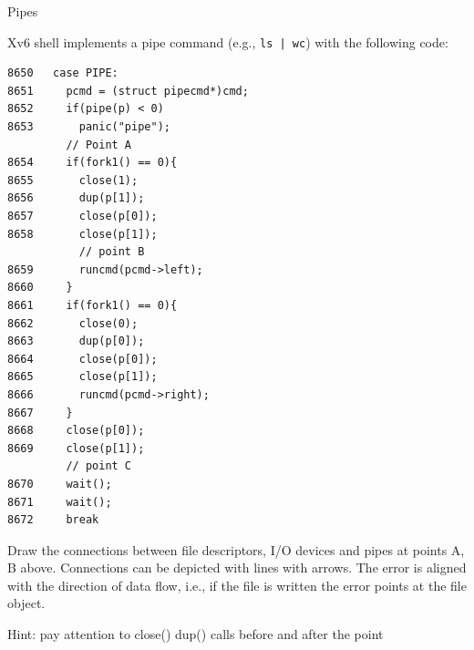 \documentclass[11pt]{exam}
\begin{document}
\begin{questions}

\addpoints 
\question Pipes

Xv6 shell implements a pipe command (e.g., \texttt{ls | wc}) with the following code: 

\begin{verbatim}
8650   case PIPE:
8651     pcmd = (struct pipecmd*)cmd;
8652     if(pipe(p) < 0)
8653       panic("pipe");
         // Point A
8654     if(fork1() == 0){
8655       close(1);
8656       dup(p[1]);
8657       close(p[0]);
8658       close(p[1]);
           // point B
8659       runcmd(pcmd->left);
8660     }
8661     if(fork1() == 0){
8662       close(0);
8663       dup(p[0]);
8664       close(p[0]);
8665       close(p[1]);
8666       runcmd(pcmd->right);
8667     }
8668     close(p[0]);
8669     close(p[1]);
         // point C
8670     wait();
8671     wait();
8672     break
\end{verbatim}

Draw the connections between file descriptors, I/O devices and pipes at points
A, B above.  Connections can be depicted with lines with arrows. The error is
aligned with the direction of data flow, i.e., if the file is written the error
points at the file object. 

Hint: pay attention to close() dup() calls before and after the point


\end{questions}
\end{document}
